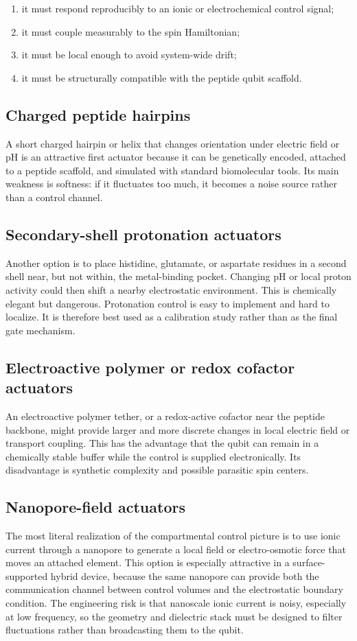 \documentclass[11pt]{report}
\newcommand{\ham}{Hamiltonian}
\theoremstyle{definition}
\begin{document}
\begin{enumerate}[leftmargin=2em]
\item it must respond reproducibly to an ionic or electrochemical control signal;
\item it must couple measurably to the spin \ham{};
\item it must be local enough to avoid system-wide drift;
\item it must be structurally compatible with the peptide qubit scaffold.
\end{enumerate}

\subsection{Charged peptide hairpins}
A short charged hairpin or helix that changes orientation under electric field or pH is an attractive first actuator because it can be genetically encoded, attached to a peptide scaffold, and simulated with standard biomolecular tools. Its main weakness is softness: if it fluctuates too much, it becomes a noise source rather than a control channel.

\subsection{Secondary-shell protonation actuators}
Another option is to place histidine, glutamate, or aspartate residues in a second shell near, but not within, the metal-binding pocket. Changing pH or local proton activity could then shift a nearby electrostatic environment. This is chemically elegant but dangerous. Protonation control is easy to implement and hard to localize. It is therefore best used as a calibration study rather than as the final gate mechanism.

\subsection{Electroactive polymer or redox cofactor actuators}
An electroactive polymer tether, or a redox-active cofactor near the peptide backbone, might provide larger and more discrete changes in local electric field or transport coupling. This has the advantage that the qubit can remain in a chemically stable buffer while the control is supplied electronically. Its disadvantage is synthetic complexity and possible parasitic spin centers.

\subsection{Nanopore-field actuators}
The most literal realization of the compartmental control picture is to use ionic current through a nanopore to generate a local field or electro-osmotic force that moves an attached element. This option is especially attractive in a surface-supported hybrid device, because the same nanopore can provide both the communication channel between control volumes and the electrostatic boundary condition. The engineering risk is that nanoscale ionic current is noisy, especially at low frequency, so the geometry and dielectric stack must be designed to filter fluctuations rather than broadcasting them to the qubit.
\end{document}
